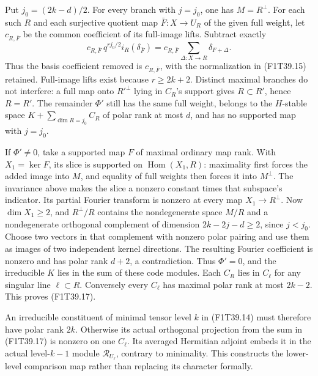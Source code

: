 Put \(j_0=(2k-d)/2\). For every branch with
\(j=j_0\), one has \(M=R^\perp\). For each such
\(R\) and each surjective quotient map
\(\bar F:X\to U_R\) of the given full weight, let
\(c_{R,\bar F}\) be the common coefficient of its
full-image lifts. Subtract exactly
\[
 c_{R,\bar F}\,q^{rj_0/2}i_R(\delta_{\bar F})
   =c_{R,\bar F}\sum_{\Delta:X\to R}\delta_{F+\Delta}.
\]
Thus the basis coefficient removed is
\(c_{R,\bar F}\), with the normalization in (F1T39.15) retained.
Full-image lifts exist because \(r\ge2k+2\).
Distinct maximal branches do not interfere: a full map
onto \(R'^\perp\) lying in \(C_R\)'s support gives
\(R\subset R'\), hence \(R=R'\).
The remainder \(\Phi'\) still has the same full weight,
belongs to the \(H\)-stable space
\(K+\sum_{\dim R=j_0}C_R\) of polar rank at most \(d\),
and has no supported map with \(j=j_0\).

If \(\Phi'\ne0\), take a supported map \(F\) of
maximal ordinary map rank. With \(X_1=\ker F\), its
slice is supported on \(\operatorname{Hom}(X_1,R)\):
maximality first forces the added image into \(M\),
and equality of full weights then forces it into
\(M^\perp\). The invariance above makes the slice a
nonzero constant times that subspace's indicator.
Its partial Fourier transform is nonzero at every map
\(X_1\to R^\perp\). Now \(\dim X_1\ge2\), and
\(R^\perp/R\) contains the nondegenerate space
\(M/R\) and a nondegenerate orthogonal complement of
dimension
\(2k-2j-d\ge2\), since \(j<j_0\).
Choose two vectors in that complement with nonzero polar
pairing and use them as images of two independent kernel
directions. The resulting Fourier coefficient is nonzero
and has polar rank \(d+2\), a contradiction.
Thus \(\Phi'=0\), and the irreducible \(K\) lies in
the sum of these code modules. Each \(C_R\) lies in
\(C_\ell\) for any singular line \(\ell\subset R\).
Conversely every \(C_\ell\) has maximal polar rank at
most \(2k-2\). This proves (F1T39.17).

An irreducible constituent of minimal tensor level \(k\)
in (F1T39.14) must therefore have polar rank \(2k\).
Otherwise its actual orthogonal projection from the sum
in (F1T39.17) is nonzero on one \(C_\ell\).
Its averaged Hermitian adjoint embeds it in the actual
level-\(k-1\) module \(\mathcal R_{U_\ell}\), contrary
to minimality. This constructs the lower-level comparison
map rather than replacing its character formally.

